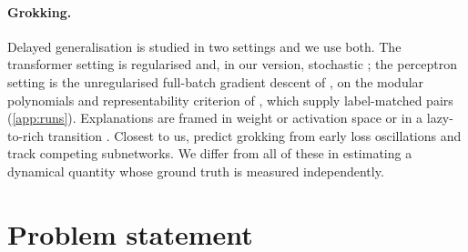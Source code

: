 \documentclass[twoside]{article}
\begin{document}
\paragraph{Grokking.} Delayed generalisation \citep{power2022grokking} is studied in two settings
and we use both. The transformer setting is regularised and, in our version, stochastic
\citep{nanda2023progress, liu2022omnigrok}; the perceptron setting is the unregularised
full-batch gradient descent of \citet{gromov2023grokking}, on the modular polynomials and
representability criterion of \citet{doshi2024grokking}, which supply label-matched pairs
(\cref{app:runs}). Explanations are framed in weight or activation space
\citep{nanda2023progress, varma2023explaining, liu2022towards, barak2022hidden} or in a
lazy-to-rich transition \citep{kumar2024grokking}. Closest to us, \citet{notsawo2023predicting}
predict grokking from early loss oscillations \citep{thilak2022slingshot} and
\citet{merrill2023tale} track competing subnetworks. We differ from all of these in estimating a
dynamical quantity whose ground truth is measured independently.

\section{Problem statement}\label{sec:problem}
\end{document}

